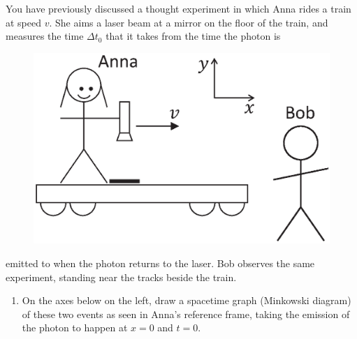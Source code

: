 You have previously discussed a thought experiment in which Anna rides a train at speed $v$.  She aims a laser beam at a mirror on the floor of the train, and measures the time $\Delta t_0$ that it takes from the time the photon is 
\begin{figure}
\begin{center}
\vspace{-0.3in}
\includegraphics[scale=0.4]{lorentz_transformations/anna_and_bob.eps}
\end{center}
\end{figure}
emitted to when the photon returns to the laser.  Bob observes the same experiment, standing near the tracks beside the train.  

\begin{enumerate}[labparts]

\item  
On the axes below on the left, draw a spacetime graph (Minkowski diagram) of these two events as seen in Anna's reference frame, taking the emission of the photon to happen at $x=0$ and $t=0$.
\end{enumerate}

\vspace{0.2in}

